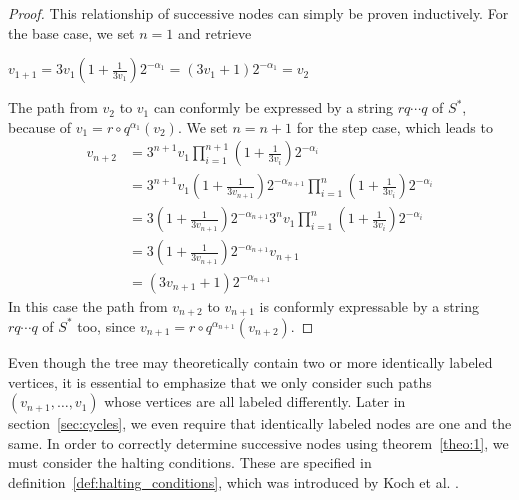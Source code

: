 \begin{proof}
	\label{proof:1}
	This relationship of successive nodes can simply be proven inductively. For the base case, we set $n=1$ and retrieve
	\begin{center}
		$v_{1+1}=3v_1\left(1+\frac{1}{3v_1}\right)2^{-\alpha_1}
		=\left(3v_1+1\right)2^{-\alpha_1}=v_2$
	\end{center}
	The path from $v_2$ to $v_1$ can conformly be expressed by a string $rq\cdots q$ of $S^\ast$, because of $v_1=r\circ q^{\alpha_1}\left(v_2\right)$. We set $n=n+1$ for the step case, which leads to
	\begin{equation*}
	\begin{array}{cl}
	v_{n+2} &
	=3^{n+1}v_1\prod_{i=1}^{n+1}\left(1+\frac{1}{3v_i}\right)2^{-\alpha_i}\\
	&
	=3^{n+1}v_1\left(1+\frac{1}{3v_{n+1}}\right)2^{-\alpha_{n+1}}\prod_{i=1}^{n}\left(1+\frac{1}{3v_i}\right)2^{-\alpha_i}\\
	&
	=3\left(1+\frac{1}{3v_{n+1}}\right)2^{-\alpha_{n+1}}3^nv_1\prod_{i=1}^{n}\left(1+\frac{1}{3v_i}\right)2^{-\alpha_i}\\
	&
	=3\left(1+\frac{1}{3v_{n+1}}\right)2^{-\alpha_{n+1}}v_{n+1}\\
	&
	=\left(3v_{n+1}+1\right)2^{-\alpha_{n+1}}
	\end{array}
	\end{equation*}
	In this case the path from $v_{n+2}$ to $v_{n+1}$ is conformly 
	expressable by a string $rq\cdots q$ of $S^\ast$ too, since
	$v_{n+1}=r\circ q^{\alpha_{n+1}}\left(v_{n+2}\right)$.
\end{proof}

Even though the tree may theoretically contain two or more identically labeled vertices, it is essential to emphasize that we only consider such paths $(v_{n+1},\ldots,v_1)$ whose vertices are all labeled differently. Later in section~\ref{sec:cycles}, we even require that identically labeled nodes are one and the same. In order to correctly determine successive nodes using theorem~\ref{theo:1}, we must consider the halting conditions. These are specified in definition~\ref{def:halting_conditions}, which was introduced by Koch et al. \cite{Ref_Koch_2020}.


